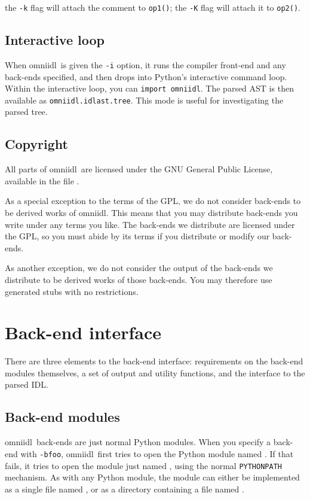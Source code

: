 \documentclass[11pt,twoside,a4paper]{article}
\newcommand{\omniidl}{\textsf{omniidl}}
\newcommand{\op}[1]{\texttt{#1()}}
\newcommand{\cmdline}[1]{\texttt{#1}}
\newcommand{\code}[1]{\texttt{#1}}
\begin{document}
\noindent the \cmdline{-k} flag will attach the comment to \op{op1};
the \cmdline{-K} flag will attach it to \op{op2}.



\subsection{Interactive loop}

When \omniidl\ is given the \cmdline{-i} option, it runs the compiler
front-end and any back-ends specified, and then drops into Python's
interactive command loop. Within the interactive loop, you can
\code{import omniidl}. The parsed AST is then available as
\code{omniidl.idlast.tree}. This mode is useful for investigating the
parsed tree.


\subsection{Copyright}

All parts of \omniidl\ are licensed under the GNU General Public
License, available in the file .

As a special exception to the terms of the GPL, we do not consider
back-ends to be derived works of \omniidl. This means that you may
distribute back-ends you write under any terms you like. The back-ends
we distribute are licensed under the GPL, so you must abide by its
terms if you distribute or modify our back-ends.

As another exception, we do not consider the output of the back-ends
we distribute to be derived works of those back-ends. You may
therefore use generated stubs with no restrictions.


\section{Back-end interface}
\label{sec:backend}

There are three elements to the back-end interface: requirements on
the back-end modules themselves, a set of output and utility
functions, and the interface to the parsed IDL.

\subsection{Back-end modules}
\label{sec:bemodules}

\omniidl\ back-ends are just normal Python modules. When you specify a
back-end with \cmdline{-bfoo}, \omniidl\ first tries to open the
Python module named . If that fails, it tries to
open the module just named , using the normal
\texttt{PYTHONPATH} mechanism. As with any Python module, the module
 can either be implemented as a single file named
, or as a directory  containing a file named
.
\end{document}
